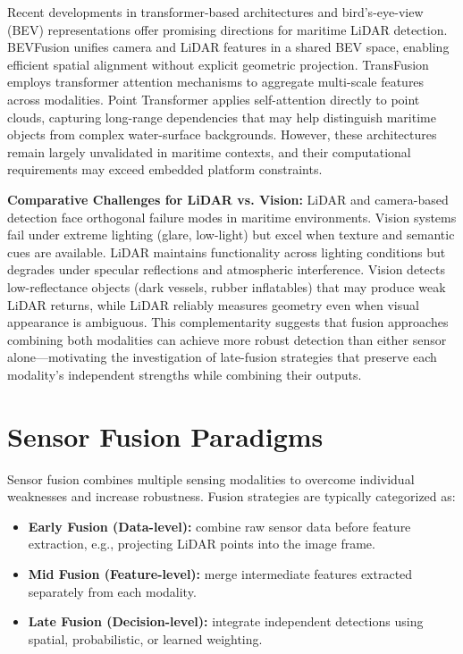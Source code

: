 \documentclass{erauthesis}
\begin{document}
Recent developments in transformer-based architectures and bird's-eye-view (BEV) representations offer promising directions for maritime LiDAR detection. BEVFusion \cite{liu2023bevfusion} unifies camera and LiDAR features in a shared BEV space, enabling efficient spatial alignment without explicit geometric projection. TransFusion \cite{bai2022transfusion} employs transformer attention mechanisms to aggregate multi-scale features across modalities. Point Transformer \cite{zhao2021} applies self-attention directly to point clouds, capturing long-range dependencies that may help distinguish maritime objects from complex water-surface backgrounds. However, these architectures remain largely unvalidated in maritime contexts, and their computational requirements may exceed embedded platform constraints.

\textbf{Comparative Challenges for LiDAR vs. Vision:} LiDAR and camera-based detection face orthogonal failure modes in maritime environments. Vision systems fail under extreme lighting (glare, low-light) but excel when texture and semantic cues are available. LiDAR maintains functionality across lighting conditions but degrades under specular reflections and atmospheric interference. Vision detects low-reflectance objects (dark vessels, rubber inflatables) that may produce weak LiDAR returns, while LiDAR reliably measures geometry even when visual appearance is ambiguous. This complementarity suggests that fusion approaches combining both modalities can achieve more robust detection than either sensor alone—motivating the investigation of late-fusion strategies that preserve each modality's independent strengths while combining their outputs.


\section{Sensor Fusion Paradigms}

Sensor fusion combines multiple sensing modalities to overcome individual weaknesses and increase robustness. Fusion strategies are typically categorized as:
\begin{itemize}
    \item \textbf{Early Fusion (Data-level):} combine raw sensor data before feature extraction, e.g., projecting LiDAR points into the image frame.
    \item \textbf{Mid Fusion (Feature-level):} merge intermediate features extracted separately from each modality.
    \item \textbf{Late Fusion (Decision-level):} integrate independent detections using spatial, probabilistic, or learned weighting.
\end{itemize}
\end{document}
